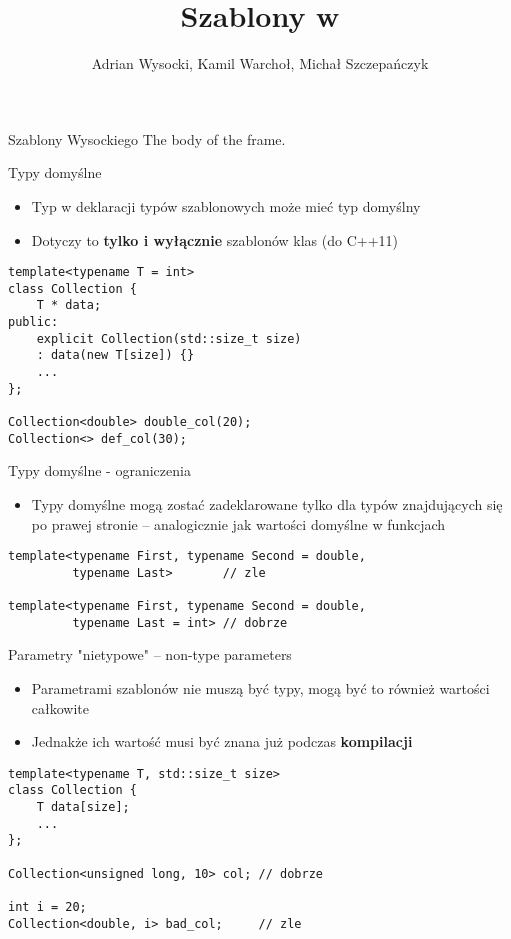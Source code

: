 \documentclass[11pt]{beamer}
\title{Szablony w \cpp}
\author[]{Adrian Wysocki, Kamil Warchoł, Michał Szczepańczyk}
\begin{document}
\begin{frame}
\titlepage
\end{frame}
\author{}
\begin{frame}{Szablony Wysockiego}
The body of the frame.
\end{frame}

\begin{frame}[fragile]{Typy domyślne}
    \begin{itemize}
        \item Typ w deklaracji typów szablonowych może mieć typ domyślny 
        \item Dotyczy to \textbf{tylko i wyłącznie} szablonów klas (do C++11)
    \end{itemize}
    \begin{lstlisting}[frame=single]
template<typename T = int>
class Collection {
    T * data;
public:
    explicit Collection(std::size_t size)
    : data(new T[size]) {}
    ...
};

Collection<double> double_col(20);
Collection<> def_col(30);
    \end{lstlisting}
\end{frame}

\begin{frame}[fragile]{Typy domyślne - ograniczenia}
    \begin{itemize}
        \item Typy domyślne mogą zostać zadeklarowane tylko dla typów znajdujących się po prawej stronie -- analogicznie jak wartości domyślne w funkcjach
    \end{itemize}
    \begin{lstlisting}[frame=single]
template<typename First, typename Second = double,
         typename Last>       // zle

template<typename First, typename Second = double,
         typename Last = int> // dobrze
    \end{lstlisting}
\end{frame}

\begin{frame}[fragile]{Parametry "nietypowe" -- non-type parameters}
    \begin{itemize}
        \item Parametrami szablonów nie muszą być typy, mogą być to również wartości całkowite
        \item Jednakże ich wartość musi być znana już podczas \textbf{kompilacji}
    \end{itemize}
    \begin{lstlisting}[frame=single]
template<typename T, std::size_t size>
class Collection {
    T data[size];
    ...
};

Collection<unsigned long, 10> col; // dobrze

int i = 20;
Collection<double, i> bad_col;     // zle
    \end{lstlisting}
\end{frame}
\end{document}
